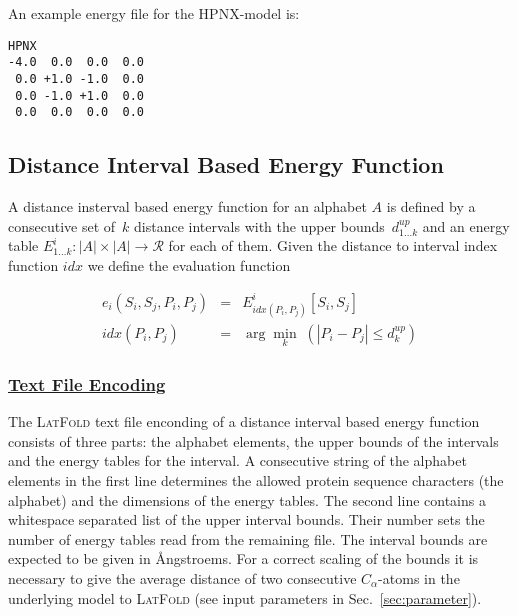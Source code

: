\documentclass{article}
\newcommand{\latfold}{\textsc{LatFold}}
\newenvironment{boxit}{\begin{lrbox}{\savepar}\begin{minipage}[t]{0.8\textwidth}}
                      {\end{minipage}\end{lrbox}\fbox{\usebox{\savepar}}}
\begin{document}
An example energy file for the HPNX-model is:

\begin{center}
\begin{boxit}
\small
\begin{verbatim}
HPNX
-4.0  0.0  0.0  0.0
 0.0 +1.0 -1.0  0.0
 0.0 -1.0 +1.0  0.0
 0.0  0.0  0.0  0.0
\end{verbatim}
\end{boxit}
\end{center}


\subsection{Distance Interval Based Energy Function}
\label{sec:energy:distance}

A distance insterval based energy function for an alphabet $A$ is defined by a
consecutive set of~$k$ distance intervals with the upper bounds~$d^{up}_{1\ldots
k}$ and an energy table $E^i_{1\ldots k} : |A|\times|A| \rightarrow \mathcal{R}$
for each of them. Given the distance to interval index function $idx$ we define
the evaluation function

\begin{eqnarray}
	e_i(S_i, S_j, P_i, P_j) & = & E^i_{idx(P_i,P_j)}[S_i,S_j] \\
	idx(P_i,P_j) & = & \arg\min_{k}\;(|P_i-P_j| \leq d^{up}_k)
\end{eqnarray}


\subsubsection*{\underline{ Text File Encoding }}

The \latfold{} text file enconding of a distance interval based energy function
consists of three parts: the alphabet elements, the upper bounds of the intervals
and the energy tables for the interval. A consecutive string of the alphabet
elements in the first line determines the allowed protein sequence characters
(the alphabet) and the dimensions of the energy tables. The second line
contains a whitespace separated list of the upper interval bounds. Their number
sets the number of energy tables read from the remaining file. The interval
bounds are expected to be given in {\AA}ngstroems. For a correct scaling of
the bounds it is necessary to give the average distance of two consecutive
$C_\alpha$-atoms in the underlying model to \latfold{} (see input parameters in
Sec.~\ref{sec:parameter}).
\end{document}
